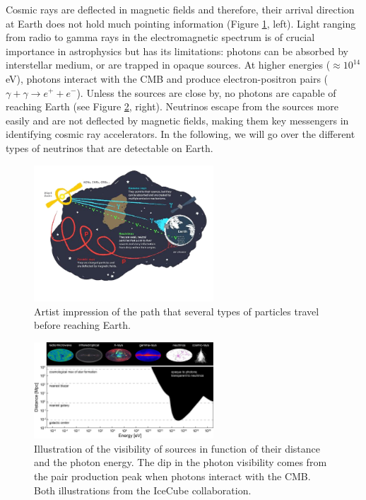 Cosmic rays are deflected in magnetic fields and therefore, their arrival direction at Earth does not hold much pointing information (Figure \ref{fig:sourceinfo}, left). Light ranging from radio to gamma rays in the electromagnetic spectrum is of crucial importance in astrophysics but has its limitations: photons can be absorbed by interstellar medium, or are trapped in opaque sources. At higher energies ($\approx 10^{14}$ eV), photons interact with the CMB and produce electron-positron pairs ($\gamma + \gamma \rightarrow e^+ + e^-$). Unless the sources are close by, no photons are capable of reaching Earth (see Figure \ref{fig:opaquephotons}, right). Neutrinos escape from the sources more easily and are not deflected by magnetic fields, making them key messengers in identifying cosmic ray accelerators. In the following, we will go over the different types of neutrinos that are detectable on Earth.


\begin{figure}[t]
\centering
\includegraphics[width=0.6\textwidth]{chapter3/img/sourceinformation_3.jpg}
\caption{Artist impression of the path that several types of particles travel before reaching Earth.}
\label{fig:sourceinfo}
\end{figure}

\begin{figure}[t]
\centering
\includegraphics[width=0.6\textwidth]{chapter3/img/opaque-to-photons.png}
\caption{Illustration of the visibility of sources in function of their distance and the photon energy. The dip in the photon visibility comes from the pair production peak when photons interact with the CMB. Both illustrations from the IceCube collaboration.}
\label{fig:opaquephotons}
\end{figure}

